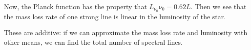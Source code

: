 \documentclass[main.tex]{subfiles}
\begin{document}
Now, the Planck function has the property that \(L_{\nu_0  } \nu_0 = 0.62 L\).
Then we see that the mass loss rate of one strong line is linear in the luminosity of the star.

These are additive: if we can approximate the mass loss rate and luminosity with other means, we can find the total number of spectral lines.
\end{document}
